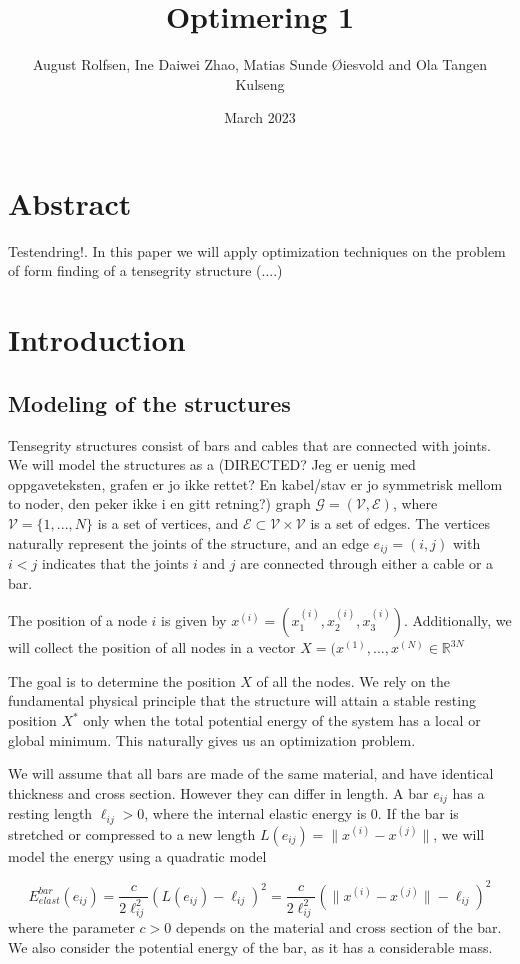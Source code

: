 \documentclass[11pt]{article}
\title{\vspace{-2em} Optimering 1\vspace{-1em}}
\author{August Rolfsen, Ine Daiwei Zhao, Matias Sunde Øiesvold and Ola Tangen Kulseng}
\date{\vspace{-1em}March 2023\vspace{-2em}}
\newcommand{\el}{\ell_{ij}}
\newcommand{\xnorm}{\lVert x^{(i)} - x^{(j)}\rVert}
\newcommand{\e}{(e_{ij})}
\newcommand{\ebe}{E^{bar}_{elast}(e_{ij})}
\begin{document}
\maketitle
\section{Abstract}
Testendring!.
In this paper we will apply optimization techniques on the problem of form finding of a tensegrity structure (....)

\section{Introduction}
\subsection{Modeling of the structures}
Tensegrity structures consist of bars and cables that are connected with joints. We will model the structures as a (DIRECTED? Jeg er uenig med oppgaveteksten, grafen er jo ikke rettet? En kabel/stav er jo symmetrisk mellom to noder, den peker ikke i en gitt retning?) graph $\mathcal{G} = (\mathcal{V},\mathcal{E})$, where $\mathcal{V} = \{1,...,N\}$ is a set of vertices, and $\mathcal{E} \subset \mathcal{V} \times \mathcal{V}$ is a set of edges. The vertices naturally represent the joints of the structure, and an edge $e_{ij} = (i,j)$ with $i < j$ indicates that the joints $i$ and $j$ are connected through either a cable or a bar.

The position of a node $i$ is given by $x^{(i)} = (x_1^{(i)},x_2^{(i)},x_3^{(i)})$. Additionally, we will collect the position of all nodes in a vector $X = (x^{(1)},...,x^{(N)} \in \mathbb{R}^{3N}$

The goal is to determine the position $X$ of all the nodes. We rely on the fundamental physical principle that the structure will attain a stable resting position $X^*$ only when the total potential energy of the system has a local or global minimum. This naturally gives us an optimization problem.

We will assume that all bars are made of the same material, and have identical thickness and cross section. However they can differ in length. A bar $e_{ij}$ has a resting length $\ell_{ij}>0$, where the internal elastic energy is $0$. If the bar is stretched or compressed to a new length $L(e_{ij})=\lVert x^{(i)} - x^{(j)}\rVert$, we will model the energy using a quadratic model


\begin{equation}
    \ebe = \frac{c}{2\el^2}(L\e - \el)^2 = \frac{c}{2 \el^2}(\xnorm - \el)^2
    \label{barElast}
\end{equation}
where the parameter $c > 0$ depends on the material and cross section of the bar. We also consider the potential energy of the bar, as it has a considerable mass.
\end{document}
